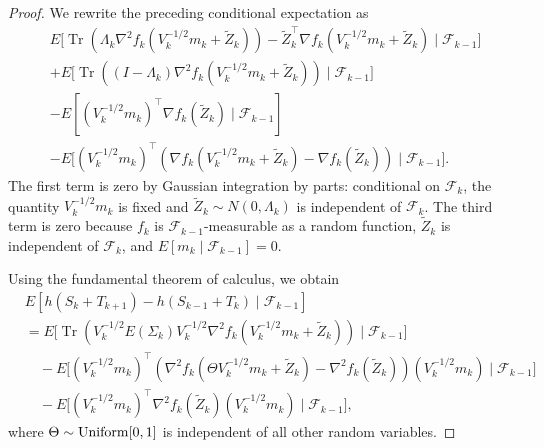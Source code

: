 \documentclass[10pt,a4paper]{article}
\begin{document}
\begin{proof}
We rewrite the preceding conditional expectation as
\begin{align*}
& E\biggl[
\operatorname{Tr}\left(
\Lambda_k
\nabla^2 f_k\left(V_k^{-1/2}m_k+\widetilde Z_k\right)
\right)
-
\widetilde Z_k^\top
\nabla f_k\left(V_k^{-1/2}m_k+\widetilde Z_k\right)
\mid
\mathcal F_{k-1}
\biggr]
\\
&+
E\biggl[
\operatorname{Tr}\left(
(I-\Lambda_k)
\nabla^2 f_k\left(V_k^{-1/2}m_k+\widetilde Z_k\right)
\right)
\mid
\mathcal F_{k-1}
\biggr]
\\
&-
E\left[
(V_k^{-1/2}m_k)^\top\nabla f_k(\widetilde Z_k)
\mid
\mathcal F_{k-1}
\right]
\\
&-
E\biggl[
(V_k^{-1/2}m_k)^\top
\left(
\nabla f_k\left(V_k^{-1/2}m_k+\widetilde Z_k\right)
-
\nabla f_k(\widetilde Z_k)
\right)
\mid
\mathcal F_{k-1}
\biggr].
\end{align*}
The first term is zero by Gaussian integration by parts: conditional on
$\mathcal F_k$, the quantity $V_k^{-1/2}m_k$ is fixed and
$\widetilde Z_k\sim N(0,\Lambda_k)$ is independent of $\mathcal F_k$. The third term is zero because $f_k$ is $\mathcal F_{k-1}$-measurable as a
random function, $\widetilde Z_k$ is independent of $\mathcal F_k$, and
$E[m_k\mid\mathcal F_{k-1}]=0$.

Using the fundamental theorem of calculus, we obtain
\begin{align*}
& E\left[
h(S_k+T_{k+1})-h(S_{k-1}+T_k)
\mid
\mathcal F_{k-1}
\right]
\\
&=
E\biggl[
\operatorname{Tr}\left(
V_k^{-1/2}E(\Sigma_k)V_k^{-1/2}
\nabla^2 f_k\left(V_k^{-1/2}m_k+\widetilde Z_k\right)
\right)
\mid
\mathcal F_{k-1}
\biggr]
\\
&\quad
-
E\biggl[
(V_k^{-1/2}m_k)^\top
\left(
\nabla^2 f_k(\Theta V_k^{-1/2}m_k+\widetilde Z_k)
-
\nabla^2 f_k(\widetilde Z_k)
\right)
(V_k^{-1/2}m_k)
\mid
\mathcal F_{k-1}
\biggr]
\\
&\quad
-
E\biggl[
(V_k^{-1/2}m_k)^\top
\nabla^2 f_k(\widetilde Z_k)
(V_k^{-1/2}m_k)
\mid
\mathcal F_{k-1}
\biggr],
\end{align*}
where \(\Theta\sim {\rm Uniform}[0,1]\) is independent of all other random
variables.


\end{proof}
\end{document}
